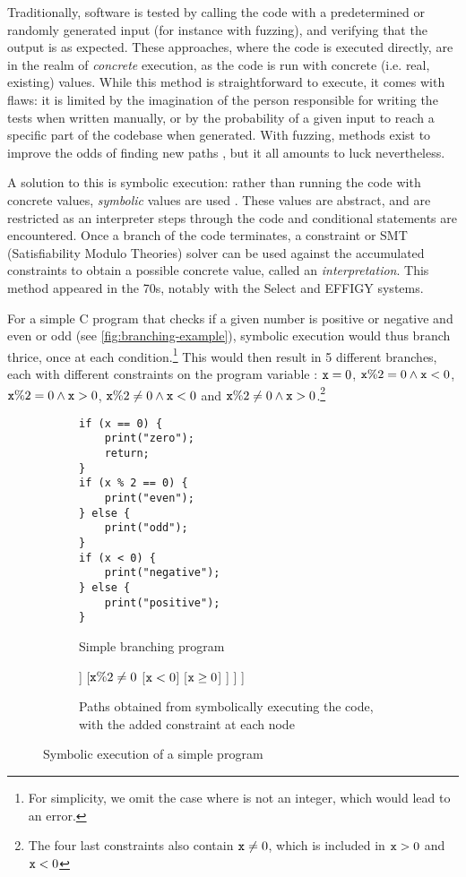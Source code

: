 Traditionally, software is tested by calling the code with a predetermined or randomly generated input (for instance with fuzzing), and verifying that the output is as expected. These approaches, where the code is executed directly, are in the realm of \emph{concrete} execution, as the code is run with concrete (i.e. real, existing) values. While this method is straightforward to execute, it comes with flaws: it is limited by the imagination of the person responsible for writing the tests when written manually, or by the probability of a given input to reach a specific part of the codebase when generated. With fuzzing, methods exist to improve the odds of finding new paths \cite{smartfuzzing}, but it all amounts to luck nevertheless.

A solution to this is symbolic execution: rather than running the code with concrete values, \emph{symbolic} values are used \cite{surveysymex}. These values are abstract, and are  restricted as an interpreter steps through the code and conditional statements are encountered. Once a branch of the code terminates, a constraint or SMT (Satisfiability Modulo Theories) solver can be used against the accumulated constraints to obtain a possible concrete value, called an \emph{interpretation}. This method appeared in the 70s, notably with the Select \cite{select-system} and EFFIGY \cite{effigy-system} systems.

For a simple C program that checks if a given number is positive or negative and even or odd (see \autoref{fig:branching-example}), symbolic execution would thus branch thrice, once at each condition.\footnote{For simplicity, we omit the case where  is not an integer, which would lead to an error.} This would then result in 5 different branches, each with different constraints on the program variable : $\code{x} = 0$, $\texttt{x}\%2=0 \land \texttt{x}<0$, $\texttt{x}\%2=0 \land \texttt{x}>0$, $\texttt{x}\%2\neq0 \land \texttt{x}<0$ and $\texttt{x}\%2\neq0 \land \texttt{x}>0$.\footnote{The four last constraints also contain $\code{x} \neq 0$, which is included in $\texttt{x}>0$ and $\code{x}<0$}

\begin{figure}[h]
\centering
\begin{subfigure}{.5\textwidth}
	\centering
	\begin{lstlisting}
if (x == 0) {
	print("zero");
	return;
}
if (x % 2 == 0) {
	print("even");
} else {
	print("odd");
}
if (x < 0) {
	print("negative");
} else {
	print("positive");
}
	\end{lstlisting}
	\caption{Simple branching program}
\end{subfigure}%
\begin{subfigure}{.5\textwidth}
\centering
\begin{forest}
[{$\top$}
	[{$\code{x} = 0$}]
	[{$\code{x}\neq 0$}
		[{$\code{x}\%2=0$}
			[{$\code{x} < 0$}]
			[{$\code{x} \geq 0$}]
		]
		[{$\texttt{x}\%2\neq0$}
			[{$\code{x} < 0$}]
			[{$\code{x} \geq 0$}]
		]
	]
]
\end{forest}
\caption{Paths obtained from symbolically executing the code, with the added constraint at each node}
\end{subfigure}
\caption{Symbolic execution of a simple program}
	\label{fig:branching-example}
\end{figure}
